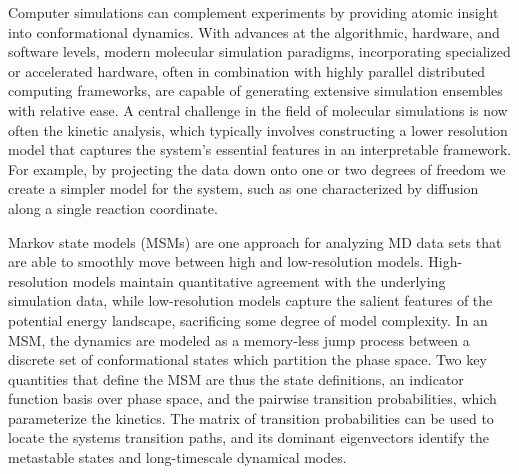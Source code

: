 \documentclass[journal=jpcbfk, layout=traditional, manuscript=article]{achemso}
\begin{document}
Computer simulations can complement experiments by providing atomic insight into conformational dynamics. With advances at the algorithmic, hardware, and software levels, modern molecular simulation paradigms, incorporating specialized or accelerated hardware, often in combination with highly parallel distributed computing frameworks, are capable of generating extensive simulation ensembles with relative ease\cite{Gotz2012Routine, Eastman2013OpenMM, Shirts2000Screen, Shaw2009Millisecond, Hess2008PLINCS, Buch2010High}. A central challenge in the field of molecular simulations is now often the kinetic analysis, which typically involves constructing a lower resolution model that captures the system's essential features in an interpretable framework\cite{Freddolino2010Challenges, Lane2013Milliseconds}. For example, by projecting the data down onto one or two degrees of freedom we create a simpler model for the system, such as one characterized by diffusion along a single reaction coordinate\cite{Best2010Coordinate}.

Markov state models (MSMs) are one approach for analyzing MD data sets that are able to smoothly move between high and low-resolution models\cite{Chodera2007Automatic, Prinz2011Markov, Beauchamp2012Simple, Bowman2013Quantitative}. High-resolution  models maintain quantitative agreement with the underlying simulation data, while low-resolution models capture the salient features of the potential energy landscape, sacrificing some degree of model complexity. In an MSM, the dynamics are modeled as a memory-less jump process between a discrete set of conformational states which partition the phase space. Two key quantities that define the MSM are thus the state definitions, an indicator function basis over phase space, and the pairwise transition probabilities, which parameterize the kinetics. The matrix of transition probabilities can be used to locate the systems transition paths, and its dominant eigenvectors identify the metastable states and long-timescale dynamical modes\cite{Weinan2006Towards, Deuflhard2000Identification}.

\end{document}
